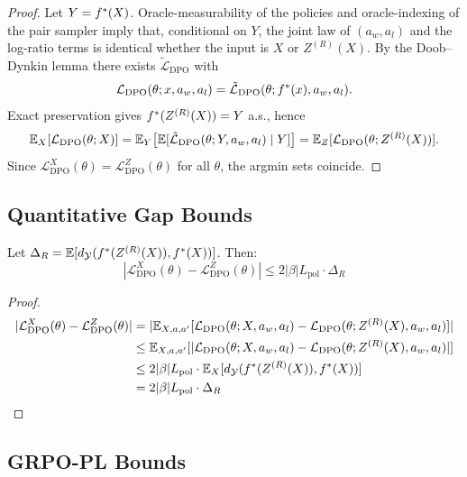 \begin{proof}
Let $Y=f^{\ast}(X)$. Oracle-measurability of the policies and oracle-indexing of the pair sampler imply that, conditional on $Y$, the joint law of $(a_w,a_l)$ and the log-ratio terms is identical whether the input is $X$ or $Z^{(R)}(X)$. By the Doob--Dynkin lemma there exists $\tilde{\mathcal{L}}_{\text{DPO}}$ with
\[
\mathcal{L}_{\text{DPO}}(\theta; x, a_w, a_l) = \tilde{\mathcal{L}}_{\text{DPO}}(\theta; f^{\ast}(x), a_w, a_l).
\]
Exact preservation gives $f^{\ast}(Z^{(R)}(X))=Y$ a.s., hence
\[
\mathbb{E}_X[\mathcal{L}_{\text{DPO}}(\theta; X)]
= \mathbb{E}_Y\!\left[\mathbb{E}[\tilde{\mathcal{L}}_{\text{DPO}}(\theta; Y, a_w, a_l)\mid Y]\right]
= \mathbb{E}_Z[\mathcal{L}_{\text{DPO}}(\theta; Z^{(R)}(X))].
\]
Since $\mathcal{L}^X_{\text{DPO}}(\theta) = \mathcal{L}^Z_{\text{DPO}}(\theta)$ for all $\theta$, the argmin sets coincide.
\end{proof}

\subsection{Quantitative Gap Bounds}

\begin{theorem}\label{app:thm:dpo-gap}
Let $\Delta_R = \mathbb{E}[d_{\mathcal{Y}}(f^{\ast}(Z^{(R)}(X)), f^{\ast}(X))]$. Then:
\[
|\mathcal{L}^X_{\text{DPO}}(\theta) - \mathcal{L}^Z_{\text{DPO}}(\theta)| \le 2|\beta| L_{\text{pol}} \cdot \Delta_R
\]
\end{theorem}

\begin{proof}
\begin{align*}
|\mathcal{L}^X_{\text{DPO}}(\theta) - \mathcal{L}^Z_{\text{DPO}}(\theta)|
&= |\mathbb{E}_{X,a,a'}[\mathcal{L}_{\text{DPO}}(\theta; X, a_w, a_l) - \mathcal{L}_{\text{DPO}}(\theta; Z^{(R)}(X), a_w, a_l)]| \\
&\le \mathbb{E}_{X,a,a'}[|\mathcal{L}_{\text{DPO}}(\theta; X, a_w, a_l) - \mathcal{L}_{\text{DPO}}(\theta; Z^{(R)}(X), a_w, a_l)|] \\
&\le 2|\beta| L_{\text{pol}} \cdot \mathbb{E}_X[d_{\mathcal{Y}}(f^{\ast}(Z^{(R)}(X)), f^{\ast}(X))] \\
&= 2|\beta| L_{\text{pol}} \cdot \Delta_R
\end{align*}
\end{proof}

\subsection{GRPO-PL Bounds}

